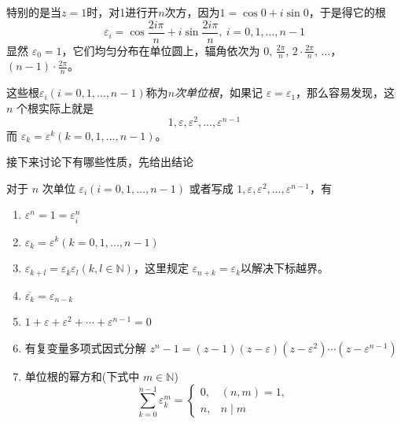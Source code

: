 特别的是当$z=1$时，对1进行开$n$次方，因为$1=\cos{0}+i\sin{0}$，于是得它的根
\[ \varepsilon_i = \cos{\frac{2i\pi}{n}}+i\sin{\frac{2i\pi}{n}}, \  i=0,1,\ldots,n-1 \]
显然 $\varepsilon_0=1$，它们均匀分布在单位圆上，辐角依次为 $0$, $\frac{2\pi}{n}$, $2\cdot \frac{2\pi}{n}$, $\ldots$，$(n-1)\cdot \frac{2\pi}{n}$。

这些根$\varepsilon_i(i=0,1,\ldots,n-1)$称为\emph{$n$次单位根}，如果记 $\varepsilon=\varepsilon_1$，那么容易发现，这 $n$ 个根实际上就是
\[ 1, \varepsilon, \varepsilon^2, \ldots, \varepsilon^{n-1} \]
而 $\varepsilon_k=\varepsilon^k(k=0,1,\ldots,n-1)$。

接下来讨论下有哪些性质，先给出结论
\begin{property}
  对于 $n$ 次单位 $\varepsilon_i(i=0,1,\ldots,n-1)$ 或者写成 $1,\varepsilon, \varepsilon^2, \ldots, \varepsilon^{n-1}$，有
  \begin{enumerate}
  \item $\varepsilon^n=1=\varepsilon_i^n$
  \item $\varepsilon_k=\varepsilon^k(k=0,1,\ldots,n-1)$
  \item $\varepsilon_{k+l}=\varepsilon_k\varepsilon_l(k,l\in \mathbb{N})$，这里规定 $\varepsilon_{n+k}=\varepsilon_{k}$以解决下标越界。
  \item $\overline{\varepsilon_k}=\varepsilon_{n-k}$
  \item $1+\varepsilon+\varepsilon^2+\cdots+\varepsilon^{n-1}=0$
  \item 有复变量多项式因式分解 $z^n-1=(z-1)(z-\varepsilon)(z-\varepsilon^2)\cdots (z-\varepsilon^{n-1})$
  \item 单位根的幂方和(下式中 $m \in \mathbb{N}$)
    \[
      \sum_{k=0}^{n-1}\varepsilon_k^m =
      \begin{cases}
        0, & (n,m)=1, \\
        n, & n \mid m
      \end{cases}
    \]
  \end{enumerate}
\end{property}

